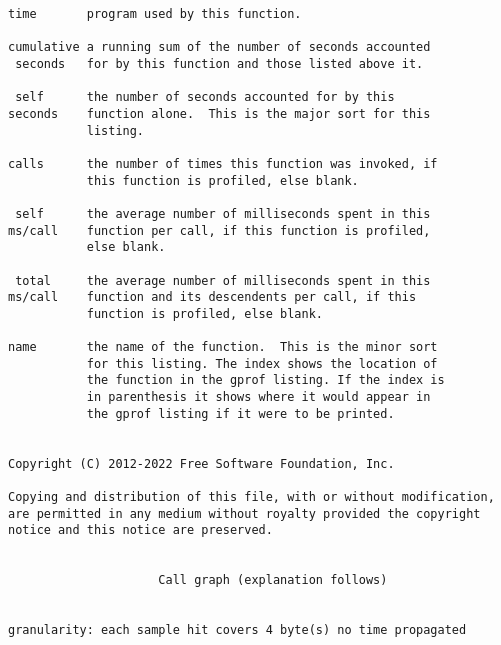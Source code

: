\documentclass[12pt]{article}
\begin{document}
\begin{lstlisting}[breaklines]
 %         the percentage of the total running time of the
time       program used by this function.

cumulative a running sum of the number of seconds accounted
 seconds   for by this function and those listed above it.

 self      the number of seconds accounted for by this
seconds    function alone.  This is the major sort for this
           listing.

calls      the number of times this function was invoked, if
           this function is profiled, else blank.

 self      the average number of milliseconds spent in this
ms/call    function per call, if this function is profiled,
           else blank.

 total     the average number of milliseconds spent in this
ms/call    function and its descendents per call, if this
           function is profiled, else blank.

name       the name of the function.  This is the minor sort
           for this listing. The index shows the location of
           the function in the gprof listing. If the index is
           in parenthesis it shows where it would appear in
           the gprof listing if it were to be printed.


Copyright (C) 2012-2022 Free Software Foundation, Inc.

Copying and distribution of this file, with or without modification,
are permitted in any medium without royalty provided the copyright
notice and this notice are preserved.


                     Call graph (explanation follows)


granularity: each sample hit covers 4 byte(s) no time propagated


\end{lstlisting}
\end{document}

